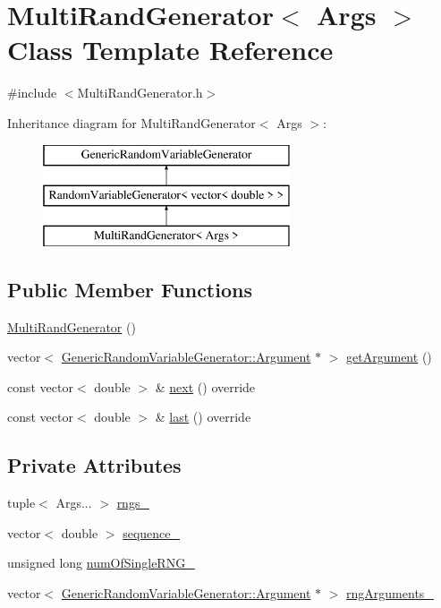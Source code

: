 \hypertarget{class_multi_rand_generator}{}\section{Multi\+Rand\+Generator$<$ Args $>$ Class Template Reference}
\label{class_multi_rand_generator}


{\ttfamily \#include $<$Multi\+Rand\+Generator.\+h$>$}

Inheritance diagram for Multi\+Rand\+Generator$<$ Args $>$\+:\begin{figure}[H]
\begin{center}
\leavevmode
\includegraphics[height=3.000000cm]{class_multi_rand_generator}
\end{center}
\end{figure}
\subsection*{Public Member Functions}
\begin{DoxyCompactItemize}
\item 
\hyperlink{class_multi_rand_generator_abf466c4d24a1c565abe493b26926f3c1}{Multi\+Rand\+Generator} ()
\item 
vector$<$ \hyperlink{class_generic_random_variable_generator_1_1_argument}{Generic\+Random\+Variable\+Generator\+::\+Argument} $\ast$ $>$ \hyperlink{class_multi_rand_generator_ab6309c317d42656c99fa0a81a019a48a}{get\+Argument} ()
\item 
const vector$<$ double $>$ \& \hyperlink{class_multi_rand_generator_a39838e440c70bb6de68052a2ea25e258}{next} () override
\item 
const vector$<$ double $>$ \& \hyperlink{class_multi_rand_generator_abb83dee0545ca24fab2999144de6f0e3}{last} () override
\end{DoxyCompactItemize}
\subsection*{Private Attributes}
\begin{DoxyCompactItemize}
\item 
tuple$<$ Args... $>$ \hyperlink{class_multi_rand_generator_a531c3ee630241e7c43b0e3fce70850b1}{rngs\+\_\+}
\item 
vector$<$ double $>$ \hyperlink{class_multi_rand_generator_a9a4e23b864633276d73890b770736edd}{sequence\+\_\+}
\item 
unsigned long \hyperlink{class_multi_rand_generator_a31ad84bf3f1e2c7db54b563945801b75}{num\+Of\+Single\+R\+N\+G\+\_\+}
\item 
vector$<$ \hyperlink{class_generic_random_variable_generator_1_1_argument}{Generic\+Random\+Variable\+Generator\+::\+Argument} $\ast$ $>$ \hyperlink{class_multi_rand_generator_a267533dce301acea01978671fa3cb72f}{rng\+Arguments\+\_\+}
\end{DoxyCompactItemize}
